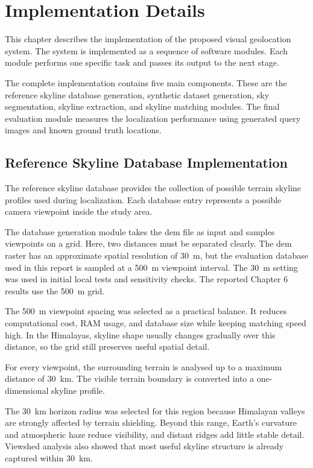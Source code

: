 \chapter{Implementation Details}

This chapter describes the implementation of the proposed visual geolocation system. The system is implemented as a sequence of software modules. Each module performs one specific task and passes its output to the next stage.

The complete implementation contains five main components. These are the reference skyline database generation, synthetic dataset generation, sky segmentation, skyline extraction, and skyline matching modules. The final evaluation module measures the localization performance using generated query images and known ground truth locations.

\section{Reference Skyline Database Implementation}

The reference skyline database provides the collection of possible terrain skyline profiles used during localization. Each database entry represents a possible camera viewpoint inside the study area.

The database generation module takes the \gls{dem} file as input and samples viewpoints on a grid. Here, two distances must be separated clearly. The \gls{dem} raster has an approximate spatial resolution of 30~m, but the evaluation database used in this report is sampled at a 500~m viewpoint interval. The 30~m setting was used in initial local tests and sensitivity checks. The reported Chapter 6 results use the 500~m grid.

The 500~m viewpoint spacing was selected as a practical balance. It reduces computational cost, RAM usage, and database size while keeping matching speed high. In the Himalayas, skyline shape usually changes gradually over this distance, so the grid still preserves useful spatial detail.

For every viewpoint, the surrounding terrain is analysed up to a maximum distance of $30$~km. The visible terrain boundary is converted into a one-dimensional skyline profile.

The 30~km horizon radius was selected for this region because Himalayan valleys are strongly affected by terrain shielding. Beyond this range, Earth's curvature and atmospheric haze reduce visibility, and distant ridges add little stable detail. Viewshed analysis also showed that most useful skyline structure is already captured within 30~km.

